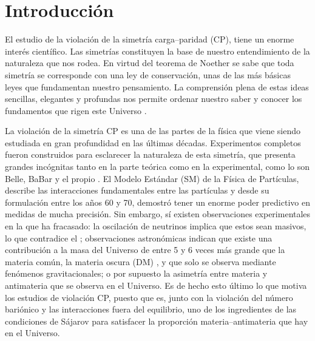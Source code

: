 \chapter{Introducción}
\label{cha:intro}


El estudio de la violación de la simetría carga--paridad (CP), tiene un enorme interés científico. Las simetrías constituyen la base de nuestro entendimiento de la naturaleza que nos rodea. En virtud del teorema de Noether se sabe que toda simetría se corresponde con una ley de conservación, unas de las más básicas leyes que fundamentan nuestro pensamiento. La comprensión plena de estas ideas sencillas, elegantes y profundas nos permite ordenar nuestro saber y conocer los fundamentos que rigen este Universo \cite{romeroTFG}.

La violación de la simetría CP es una de las partes de la física que viene siendo estudiada en gran profundidad en las últimas décadas. Experimentos completos fueron construidos para esclarecer la naturaleza de esta simetría, que presenta grandes incógnitas tanto en la parte teórica como en la experimental, como lo son Belle, BaBar y el propio \lhcb.
El Modelo Estándar (SM) de la Física de Partículas, describe las interacciones fundamentales entre las partículas y desde su formulación entre los años 60 y 70, demostró tener un enorme poder predictivo en medidas de mucha precisión. Sin embargo, sí existen observaciones experimentales en la que ha fracasado: la oscilación de neutrinos \cite{maltoni2004status} implica que estos sean masivos, lo que contradice el \stdmod; observaciones astronómicas indican que existe una contribución a la masa del Universo de entre 5 y 6 veces más grande que la materia común, la materia oscura (DM) \cite{bertone2005particle}, y que solo se observa mediante fenómenos gravitacionales; o por supuesto la asimetría entre materia y antimateria que se observa en el Universo. Es de hecho esto último lo que motiva los estudios de violación CP, puesto que es, junto con la violación del número bariónico y las interacciones fuera del equilibrio, uno de los ingredientes de las condiciones de Sájarov \cite{Sakharov:1967dj} para satisfacer la proporción materia--antimateria que hay en el Universo.


